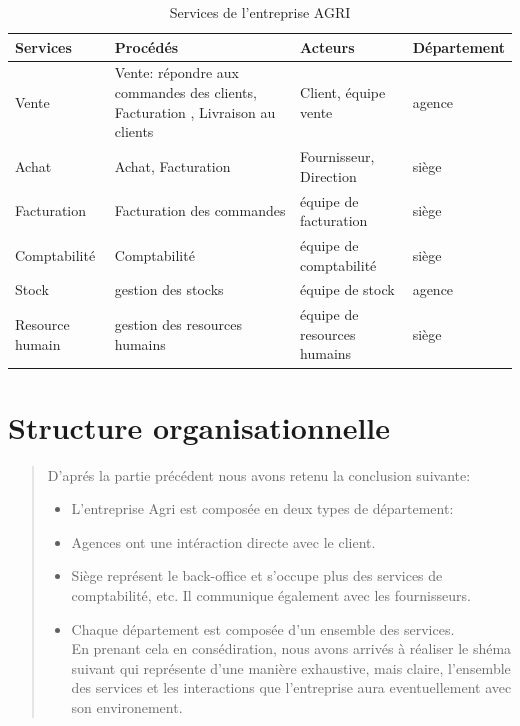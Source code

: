 \documentclass[a4paper]{report}
\begin{document}
\begin{doublespace}
\begin{table}[H]
\begin{center}
\begin{tabularx}{17.5cm}{|p{2.5cm}|p{7cm}|X|p{2cm}|}
\hline
Services & Procédés & Acteurs & Département \\
\hline
Vente & Vente: répondre aux commandes des clients, Facturation ,
Livraison au clients & Client, équipe vente & agence \\
\hline
Achat & Achat, Facturation & Fournisseur, Direction & siège \\
\hline
Facturation & Facturation des commandes & équipe de facturation &
siège \\
\hline
Comptabilité & Comptabilité & équipe de comptabilité & siège \\
\hline
Stock & gestion des stocks & équipe de stock & agence \\
\hline
Resource humain & gestion des resources humains & équipe de resources
humains & siège \\
\hline
\end{tabularx}
\caption{Services de l'entreprise AGRI}
\end{center}
\end{table}
\section{Structure organisationnelle}

\begin{quote}
D'aprés la partie précédent nous avons retenu la conclusion suivante:

\begin{itemize}
\item
  L'entreprise Agri est composée en deux types de département:
\end{itemize}

\begin{itemize}
\item
  Agences ont une intéraction directe avec le client.
\item
  Siège représent le back-office et s'occupe plus des services de
  comptabilité, etc. Il communique également avec les fournisseurs.
\end{itemize}

\begin{itemize}
\item
  Chaque département est composée d'un ensemble des services.\\
  En prenant cela en consédiration, nous avons arrivés à réaliser le
  shéma suivant qui représente d'une manière exhaustive, mais claire,
  l'ensemble des services et les interactions que l'entreprise aura
  eventuellement avec son environement.
\end{itemize}
\end{quote}


\end{doublespace}
\end{document}
